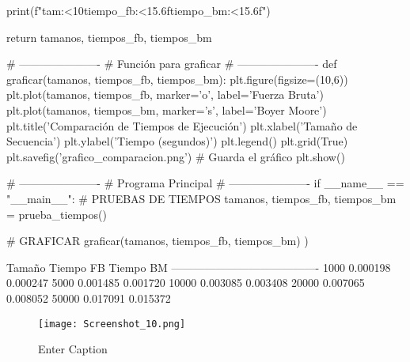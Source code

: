 \documentclass[fleqn,10pt]{article}
\begin{document}
        print(f"{tam:<10}{tiempo_fb:<15.6f}{tiempo_bm:<15.6f}")

    return tamanos, tiempos_fb, tiempos_bm

# ----------------------
# Función para graficar
# ----------------------
def graficar(tamanos, tiempos_fb, tiempos_bm):
    plt.figure(figsize=(10,6))
    plt.plot(tamanos, tiempos_fb, marker='o', label='Fuerza Bruta')
    plt.plot(tamanos, tiempos_bm, marker='s', label='Boyer Moore')
    plt.title('Comparación de Tiempos de Ejecución')
    plt.xlabel('Tamaño de Secuencia')
    plt.ylabel('Tiempo (segundos)')
    plt.legend()
    plt.grid(True)
    plt.savefig('grafico_comparacion.png')  # Guarda el gráfico
    plt.show()

# ----------------------
# Programa Principal
# ----------------------
if __name__ == "__main__":
    # PRUEBAS DE TIEMPOS
    tamanos, tiempos_fb, tiempos_bm = prueba_tiempos()

    # GRAFICAR
    graficar(tamanos, tiempos_fb, tiempos_bm)
)




Tamaño    Tiempo FB      Tiempo BM      
----------------------------------------
1000      0.000198       0.000247       
5000      0.001485       0.001720       
10000     0.003085       0.003408       
20000     0.007065       0.008052       
50000     0.017091       0.015372    

\begin{figure}
    \centering
    \texttt{[image: Screenshot\_10.png]}
    \caption{Enter Caption}
    \label{fig:enter-label}
\end{figure}
\end{document}
